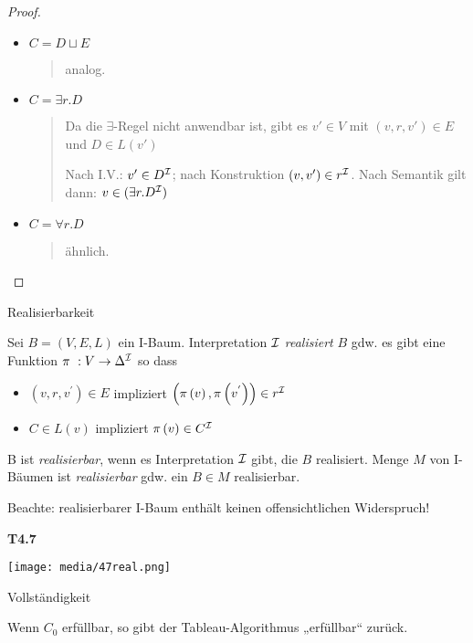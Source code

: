 \begin{proof}
\begin{itemize}
\item $C = D \sqcup E$

\begin{quote}
analog.
\end{quote}

\item $C = \exists r.D$

\begin{quote}
Da die $\exists$-Regel nicht anwendbar ist, gibt es $v'\in V$ mit $(v,r,v') \in E$ und $D \in L(v')$

Nach I.V.: $v' \in D^{\mathcal{I}}$; nach Konstruktion $(v,v') \in r^{\mathcal{I}}$. Nach Semantik gilt dann: $v \in (\exists r.D^{\mathcal{I}})$
\end{quote}

\item $C = \forall r.D$
\begin{quote}
ähnlich.
\end{quote}
\end{itemize}
\end{proof}

\begin{definition}{Realisierbarkeit}

Sei $B = \left( V,E,L \right)$ ein I-Baum. Interpretation $\mathcal{I}$
\emph{realisiert} $B$ gdw. es gibt eine Funktion
$\pi\ :V \rightarrow \Delta^{\mathcal{I}}$ so dass

\begin{itemize}
\item
  $\left( v,r,v^{'} \right) \in E$ impliziert
  $\left( \pi\left( v \right),\pi\left( v^{'} \right) \right) \in r^{\mathcal{I}}$
\item
  $C \in L\left( v \right)$ impliziert
  $\pi\left( v \right) \in C^{\mathcal{I}}$
\end{itemize}

B ist \emph{realisierbar}, wenn es Interpretation $\mathcal{I}$ gibt, die $B$
realisiert. Menge $M$ von I-Bäumen ist \emph{realisierbar} gdw. ein
$B \in M$ realisierbar.
\end{definition}

Beachte: realisierbarer I-Baum enthält keinen offensichtlichen Widerspruch!

\textbf{T4.7}

\texttt{[image: media/47real.png]}

\begin{proposition}{Vollständigkeit}

Wenn $C_{0}$ erfüllbar, so gibt der Tableau-Algorithmus „erfüllbar``
zurück.
\end{proposition}

